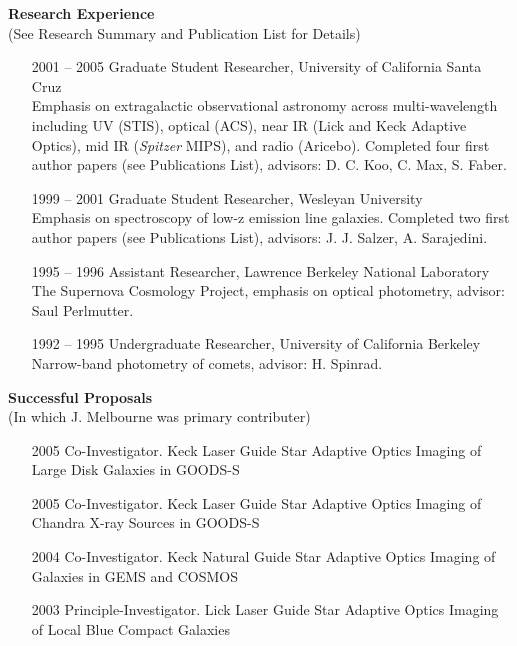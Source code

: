 \documentclass[12pt]{article}
\begin{document}
\noindent
{\bf{Research Experience}} \\
(See Research Summary and Publication List for Details)
\begin{itemize}
\addtolength{\itemsep}{-0.25cm}

\item[2001] -- 2005 Graduate Student Researcher, University of California Santa Cruz\\
Emphasis on extragalactic observational astronomy across multi-wavelength including UV (STIS), optical (ACS), near IR (Lick and Keck Adaptive Optics), mid IR (\emph{Spitzer} MIPS), and radio (Aricebo).  Completed four first author papers (see Publications List), advisors: D. C. Koo, C. Max, S. Faber.

\item[1999] -- 2001 Graduate Student Researcher, Wesleyan University \\
Emphasis on spectroscopy of low-z emission line galaxies.  Completed two first author papers (see Publications List), advisors: J. J. Salzer, A. Sarajedini.

\item[1995] -- 1996 Assistant Researcher, Lawrence Berkeley National Laboratory\\
The Supernova Cosmology Project, emphasis on optical photometry, advisor: Saul Perlmutter.

\item[1992] -- 1995 Undergraduate Researcher, University of California Berkeley\\
Narrow-band photometry of comets,  advisor: H. Spinrad.   

\end{itemize}

\noindent
{\bf{Successful Proposals}} \\
(In which J. Melbourne was primary contributer)
\begin{itemize}
\addtolength{\itemsep}{-0.25cm}

\item [2005] Co-Investigator. Keck Laser Guide Star Adaptive Optics Imaging of Large Disk Galaxies in GOODS-S 

\item [2005] Co-Investigator. Keck Laser Guide Star Adaptive Optics Imaging of Chandra X-ray Sources in GOODS-S

\item [2004] Co-Investigator. Keck Natural Guide Star Adaptive Optics Imaging of Galaxies in GEMS and COSMOS

\item [2003] Principle-Investigator. Lick Laser Guide Star Adaptive Optics Imaging of Local Blue Compact Galaxies  
\end{itemize}
\end{document}
